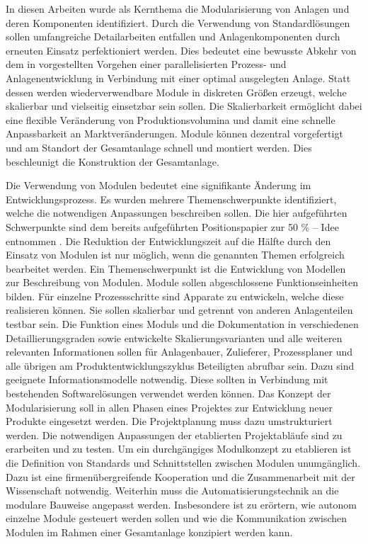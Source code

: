 In diesen Arbeiten wurde als Kernthema die Modularisierung von Anlagen und deren Komponenten identifiziert. Durch die Verwendung von Standardl\"osungen sollen umfangreiche Detailarbeiten entfallen und Anlagenkomponenten durch erneuten Einsatz perfektioniert werden. Dies bedeutet eine bewusste Abkehr von dem in \cite{Dietz_2000} vorgestellten Vorgehen einer parallelisierten Prozess- und Anlagenentwicklung in Verbindung mit einer optimal ausgelegten Anlage. Statt dessen werden wiederverwendbare Module in diskreten Gr\"o\ss{}en erzeugt, welche skalierbar und vielseitig einsetzbar sein sollen. Die Skalierbarkeit erm\"oglicht dabei eine flexible Ver\"anderung von Produktionsvolumina und damit eine schnelle Anpassbarkeit an Marktver\"anderungen. Module k\"onnen dezentral vorgefertigt und am Standort der Gesamtanlage schnell und montiert werden. Dies beschleunigt die Konstruktion der Gesamtanlage. \par

Die Verwendung von Modulen bedeutet eine signifikante \"Anderung im Entwicklungsprozess. Es wurden mehrere Themenschwerpunkte identifiziert, welche die notwendigen Anpassungen beschreiben sollen. Die hier aufgef\"uhrten Schwerpunkte sind dem bereits aufgef\"uhrten Positionspapier zur 50 \% -- Idee entnommen \cite{Processnet_2010}.  Die Reduktion der Entwicklungszeit auf die H\"alfte durch den Einsatz von Modulen ist nur m\"oglich, wenn die genannten Themen erfolgreich bearbeitet werden. \linebreak
Ein Themenschwerpunkt ist die Entwicklung von Modellen zur Beschreibung von Modulen. Module sollen abgeschlossene Funktionseinheiten bilden. F\"ur einzelne Prozessschritte sind Apparate zu entwickeln, welche diese realisieren k\"onnen. Sie sollen skalierbar und getrennt von anderen Anlagenteilen testbar sein. \linebreak
Die Funktion eines Moduls und die Dokumentation in verschiedenen Detaillierungsgraden sowie entwickelte Skalierungsvarianten und alle weiteren relevanten Informationen sollen f\"ur Anlagenbauer, Zulieferer, Prozessplaner und alle \"ubrigen am Produktentwicklungszyklus Beteiligten abrufbar sein. Dazu sind geeignete Informationsmodelle notwendig. Diese sollten in Verbindung mit bestehenden Softwarel\"osungen verwendet werden k\"onnen. \linebreak
Das Konzept der Modularisierung soll in allen Phasen eines Projektes zur Entwicklung neuer Produkte eingesetzt werden. Die Projektplanung muss dazu umstrukturiert werden. Die notwendigen Anpassungen der etablierten Projektabl\"aufe sind zu erarbeiten und zu testen. \linebreak
Um ein durchg\"angiges Modulkonzept zu etablieren ist die Definition von Standards und Schnittstellen zwischen Modulen unumg\"anglich. Dazu ist eine firmen\"ubergreifende Kooperation und die Zusammenarbeit mit der Wissenschaft notwendig. \linebreak
Weiterhin muss die Automatisierungstechnik an die modulare Bauweise angepasst werden. Insbesondere ist zu er\"ortern, wie autonom einzelne Module gesteuert werden sollen und wie die Kommunikation zwischen Modulen im Rahmen einer Gesamtanlage konzipiert werden kann.

